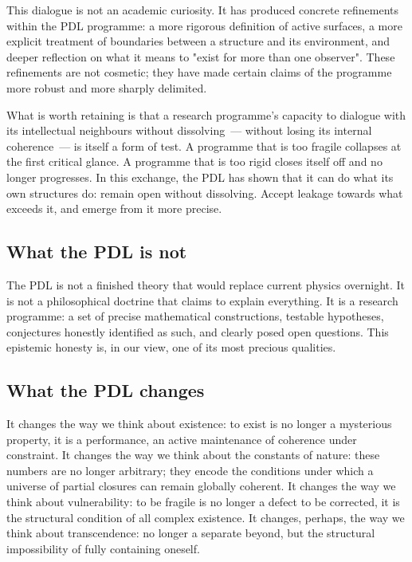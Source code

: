 \documentclass[12pt, a4paper, openright]{book}
\begin{document}
\medskip

This dialogue is not an academic curiosity. It has produced concrete refinements within the PDL programme: a more rigorous definition of active surfaces, a more explicit treatment of boundaries between a structure and its environment, and deeper reflection on what it means to "exist for more than one observer". These refinements are not cosmetic; they have made certain claims of the programme more robust and more sharply delimited.

\medskip

What is worth retaining is that a research programme's capacity to dialogue with its intellectual neighbours without dissolving~--- without losing its internal coherence~--- is itself a form of test. A programme that is too fragile collapses at the first critical glance. A programme that is too rigid closes itself off and no longer progresses. In this exchange, the PDL has shown that it can do what its own structures do: remain open without dissolving. Accept leakage towards what exceeds it, and emerge from it more precise.

\subsection*{What the PDL is not}

The PDL is not a finished theory that would replace current physics overnight. It is not a philosophical doctrine that claims to explain everything. It is a research programme: a set of precise mathematical constructions, testable hypotheses, conjectures honestly identified as such, and clearly posed open questions. This epistemic honesty is, in our view, one of its most precious qualities.

\subsection*{What the PDL changes}

It changes the way we think about existence: to exist is no longer a mysterious property, it is a performance, an active maintenance of coherence under constraint. It changes the way we think about the constants of nature: these numbers are no longer arbitrary; they encode the conditions under which a universe of partial closures can remain globally coherent. It changes the way we think about vulnerability: to be fragile is no longer a defect to be corrected, it is the structural condition of all complex existence. It changes, perhaps, the way we think about transcendence: no longer a separate beyond, but the structural impossibility of fully containing oneself.
\end{document}
